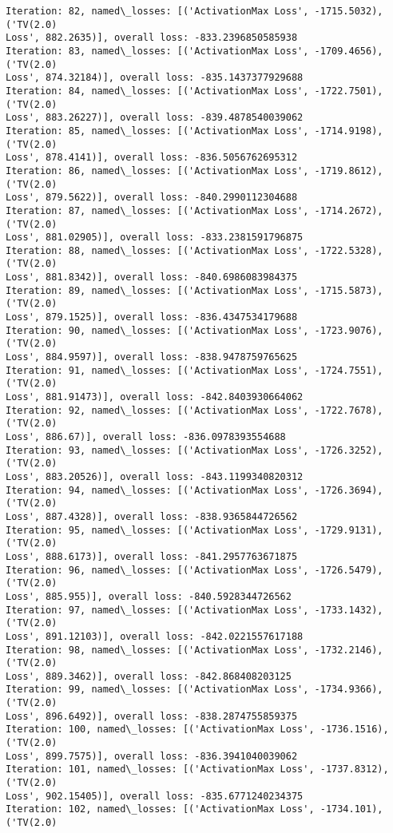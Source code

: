 \documentclass[10pt]{article}
\begin{document}
\begin{Verbatim}[commandchars=\\\{\}]
Iteration: 82, named\_losses: [('ActivationMax Loss', -1715.5032), ('TV(2.0)
Loss', 882.2635)], overall loss: -833.2396850585938
Iteration: 83, named\_losses: [('ActivationMax Loss', -1709.4656), ('TV(2.0)
Loss', 874.32184)], overall loss: -835.1437377929688
Iteration: 84, named\_losses: [('ActivationMax Loss', -1722.7501), ('TV(2.0)
Loss', 883.26227)], overall loss: -839.4878540039062
Iteration: 85, named\_losses: [('ActivationMax Loss', -1714.9198), ('TV(2.0)
Loss', 878.4141)], overall loss: -836.5056762695312
Iteration: 86, named\_losses: [('ActivationMax Loss', -1719.8612), ('TV(2.0)
Loss', 879.5622)], overall loss: -840.2990112304688
Iteration: 87, named\_losses: [('ActivationMax Loss', -1714.2672), ('TV(2.0)
Loss', 881.02905)], overall loss: -833.2381591796875
Iteration: 88, named\_losses: [('ActivationMax Loss', -1722.5328), ('TV(2.0)
Loss', 881.8342)], overall loss: -840.6986083984375
Iteration: 89, named\_losses: [('ActivationMax Loss', -1715.5873), ('TV(2.0)
Loss', 879.1525)], overall loss: -836.4347534179688
Iteration: 90, named\_losses: [('ActivationMax Loss', -1723.9076), ('TV(2.0)
Loss', 884.9597)], overall loss: -838.9478759765625
Iteration: 91, named\_losses: [('ActivationMax Loss', -1724.7551), ('TV(2.0)
Loss', 881.91473)], overall loss: -842.8403930664062
Iteration: 92, named\_losses: [('ActivationMax Loss', -1722.7678), ('TV(2.0)
Loss', 886.67)], overall loss: -836.0978393554688
Iteration: 93, named\_losses: [('ActivationMax Loss', -1726.3252), ('TV(2.0)
Loss', 883.20526)], overall loss: -843.1199340820312
Iteration: 94, named\_losses: [('ActivationMax Loss', -1726.3694), ('TV(2.0)
Loss', 887.4328)], overall loss: -838.9365844726562
Iteration: 95, named\_losses: [('ActivationMax Loss', -1729.9131), ('TV(2.0)
Loss', 888.6173)], overall loss: -841.2957763671875
Iteration: 96, named\_losses: [('ActivationMax Loss', -1726.5479), ('TV(2.0)
Loss', 885.955)], overall loss: -840.5928344726562
Iteration: 97, named\_losses: [('ActivationMax Loss', -1733.1432), ('TV(2.0)
Loss', 891.12103)], overall loss: -842.0221557617188
Iteration: 98, named\_losses: [('ActivationMax Loss', -1732.2146), ('TV(2.0)
Loss', 889.3462)], overall loss: -842.868408203125
Iteration: 99, named\_losses: [('ActivationMax Loss', -1734.9366), ('TV(2.0)
Loss', 896.6492)], overall loss: -838.2874755859375
Iteration: 100, named\_losses: [('ActivationMax Loss', -1736.1516), ('TV(2.0)
Loss', 899.7575)], overall loss: -836.3941040039062
Iteration: 101, named\_losses: [('ActivationMax Loss', -1737.8312), ('TV(2.0)
Loss', 902.15405)], overall loss: -835.6771240234375
Iteration: 102, named\_losses: [('ActivationMax Loss', -1734.101), ('TV(2.0)

\end{Verbatim}
\end{document}
